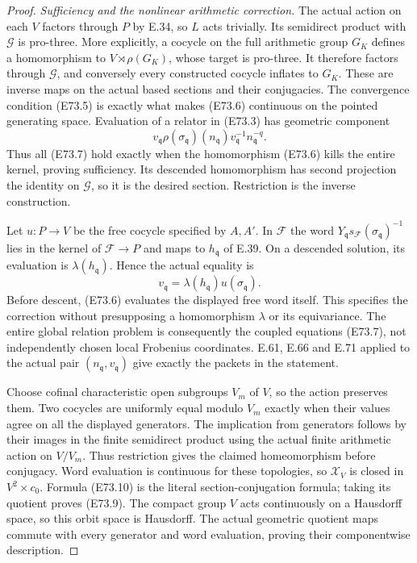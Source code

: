 \begin{proof}
\emph{Sufficiency and the nonlinear arithmetic correction.}
The actual action on each $V$ factors through
$P$ by E.34, so $L$ acts trivially. Its semidirect
product with $\mathcal G$ is pro-three. More explicitly,
a cocycle on the full arithmetic group $G_K$ defines
a homomorphism to $V\rtimes\rho(G_K)$, whose target
is pro-three. It therefore factors through
$\mathcal G$, and conversely every constructed
cocycle inflates to $G_K$. These are inverse maps
on the actual based sections and their conjugacies.
The
convergence condition (E73.5) is exactly what
makes (E73.6) continuous on the pointed generating
space. Evaluation of a relator in (E73.3) has
geometric component
\[
 v_{\mathfrak q}\rho(\sigma_{\mathfrak q})(n_{\mathfrak q})
       v_{\mathfrak q}^{-1}n_{\mathfrak q}^{-q}.
 \tag{E73.20}
\]
Thus all (E73.7) hold exactly when the homomorphism
(E73.6) kills the entire kernel, proving sufficiency.
Its descended homomorphism has second projection
the identity on $\mathcal G$, so it is the desired
section. Restriction is the inverse construction.

Let $u:P\to V$ be the free cocycle specified by
$A,A'$. In $\mathcal F$ the word
$Y_{\mathfrak q}s_{\mathcal F}(\sigma_{\mathfrak q})^{-1}$
lies in the kernel of $\mathcal F\to P$ and maps
to $h_{\mathfrak q}$ of E.39. On a descended solution,
its evaluation is $\lambda(h_{\mathfrak q})$. Hence
the actual equality is
\[
       v_{\mathfrak q}
             =\lambda(h_{\mathfrak q})u(\sigma_{\mathfrak q}).
 \tag{E73.21}
\]
Before descent, (E73.6) evaluates the displayed
free word itself. This specifies the correction
without presupposing a homomorphism $\lambda$
or its equivariance. The entire global relation
problem is consequently the coupled equations
(E73.7), not independently chosen local Frobenius
coordinates. E.61, E.66 and E.71 applied to the
actual pair $(n_{\mathfrak q},v_{\mathfrak q})$
give exactly the packets in the statement.

Choose cofinal characteristic open subgroups
$V_m$ of $V$, so the action preserves them.
Two cocycles are uniformly equal modulo $V_m$
exactly when their values agree on all the
displayed generators. The implication from
generators follows by their images in the
finite semidirect product using the actual
finite arithmetic action on $V/V_m$.
Thus restriction gives the claimed homeomorphism
before conjugacy. Word evaluation is continuous
for these topologies, so $\mathcal X_V$ is closed
in $V^2\times c_0$. Formula (E73.10) is the
literal section-conjugation formula; taking
its quotient proves (E73.9). The compact group
$V$ acts continuously on a Hausdorff space, so
this orbit space is Hausdorff. The actual
geometric quotient maps commute with every
generator and word evaluation, proving their
componentwise description.


\end{proof}
